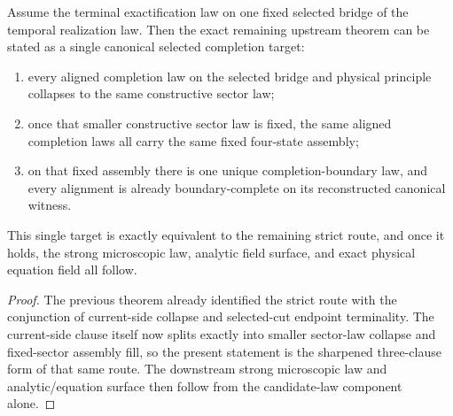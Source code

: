 \begin{theorem}
\label{thm:canonical-selected-completion-target}
Assume the terminal exactification law on one fixed selected bridge of the
temporal realization law. Then the exact remaining upstream theorem can be
stated as a single canonical selected completion target:
\begin{enumerate}
\item every aligned completion law on the selected bridge and physical
principle collapses to the same constructive sector law;
\item once that smaller constructive sector law is fixed, the same aligned
completion laws all carry the same fixed four-state assembly;
\item on that fixed assembly there is one unique completion-boundary law, and
every alignment is already boundary-complete on its reconstructed
canonical witness.
\end{enumerate}
This single target is exactly equivalent to the remaining strict route, and
once it holds, the strong microscopic law, analytic field surface, and exact
physical equation field all follow.
\end{theorem}

\begin{proof}
The previous theorem already identified the strict route with the conjunction
of current-side collapse and selected-cut endpoint terminality. The current-side
clause itself now splits exactly into smaller sector-law collapse and
fixed-sector assembly fill, so the present statement is the sharpened
three-clause form of that same route. The downstream strong microscopic law
and analytic/equation surface then follow from the
candidate-law component alone.
\end{proof}

